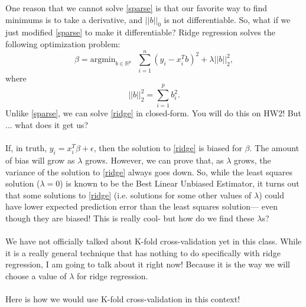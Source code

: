 One reason that we cannot solve \eqref{sparse} is that our favorite way to find minimums is to take a derivative, and $||b||_0$ is not differentiable. So, what if we just modified  \eqref{sparse} to make it differentiable? Ridge regression solves the following optimization problem:
\begin{equation}
\label{ridge}	
\hat{\beta} = \mathrm{argmin}_{b \in \mathbb{R}^p} \ \ \ \sum_{i=1}^n \left( y_i - x_i^T b \right)^2 + \lambda ||b||_2^2,
\end{equation}
where
$$
||b||_2^2 = \sum_{i=1}^p b_i^2. 
$$
Unlike \eqref{sparse}, we can solve \eqref{ridge} in closed-form. You will do this on HW2! But ... what does it get us?\\
\\
If, in truth, $y_i = x_i^T \beta + \epsilon$, then the solution to  \eqref{ridge} is biased for $\beta$. The amount of bias will grow as $\lambda$ grows. However, we can prove that, as $\lambda$ grows, the variance of the solution to \eqref{ridge} always goes down. So, while the least squares solution ($\lambda=0$) is known to be the Best Linear Unbiased Estimator, it turns out that some solutions to \eqref{ridge} (i.e. solutions for some other values of $\lambda$) could have lower expected prediction error than the least squares solution--- even though they are biased! This is really cool- but how do we find these $\lambda$s? \\
\\
We have not officially talked about K-fold cross-validation yet in this class. While it is a really general technique that has nothing to do specifically with ridge regression, I am going to talk about it right now! Because it is the way we will choose a value of $\lambda$ for ridge regression. \\
\\
Here is how we would use K-fold cross-validation in this context! 
